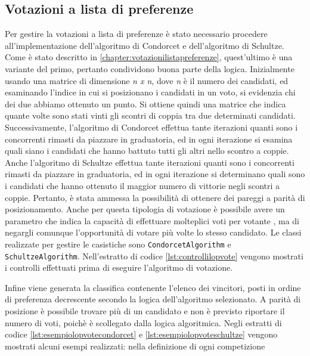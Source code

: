\documentclass[12pt,a4paper,openright,twoside]{book}
\begin{document}
\subsection{Votazioni a lista di preferenze}
Per gestire la votazioni a lista di preferenze è stato necessario procedere all'implementazione dell'algoritmo di
Condorcet e dell'algoritmo di Schultze. Come è stato descritto in \ref{chapter:votazionilistapreferenze}, quest'ultimo
è una variante del primo, pertanto condividono buona parte della logica.
Inizialmente usando una matrice di dimensione \textit{n x n}, dove \textit{n} è il numero dei candidati, ed esaminando l'indice in cui si posizionano i 
candidati in un voto, si evidenzia chi dei due abbiamo ottenuto un punto. Si ottiene quindi una matrice che indica quante volte 
sono stati vinti gli scontri di coppia tra due determinati candidati.
Successivamente, l'algoritmo di Condorcet effettua tante iterazioni quanti sono i concorrenti rimasti da piazzare in graduatoria,
ed in ogni iterazione si esamina quali siano i candidati che hanno battuto tutti gli altri nello scontro a coppie.
Anche l'algoritmo di Schultze effettua tante iterazioni quanti sono i concorrenti rimasti da piazzare in graduatoria, ed in ogni iterazione
si determinano quali sono i candidati che hanno ottenuto il maggior numero di vittorie negli scontri a coppie.
Pertanto, è stata ammessa la possibilità di ottenere dei pareggi a parità di posizionamento.
Anche per questa tipologia di votazione è possibile avere un parametro che indica la capacità di effettuare molteplici voti per votante , ma di negargli
comunque l'opportunità di votare più volte lo stesso candidato.
Le classi realizzate per gestire le casistiche sono \texttt{CondorcetAlgorithm} e \\
\texttt{SchultzeAlgorithm}.
Nell'estratto di codice \ref{lst:controllilopvote} vengono mostrati i controlli effettuati prima di 
eseguire l'algoritmo di votazione.

Infine viene generata la classifica contenente l'elenco dei vincitori, posti in ordine di preferenza decrescente secondo la logica dell'algoritmo selezionato.
A parità di posizione è possibile trovare
più di un candidato e non è previsto riportare il numero di voti, poichè è scollegato dalla logica algoritmica.
Negli estratti di codice \ref{lst:esempiolopvotecondorcet} e \ref{lst:esempiolopvoteschultze} vengono mostrati alcuni esempi realizzati: nella definizione di ogni competizione
\end{document}
